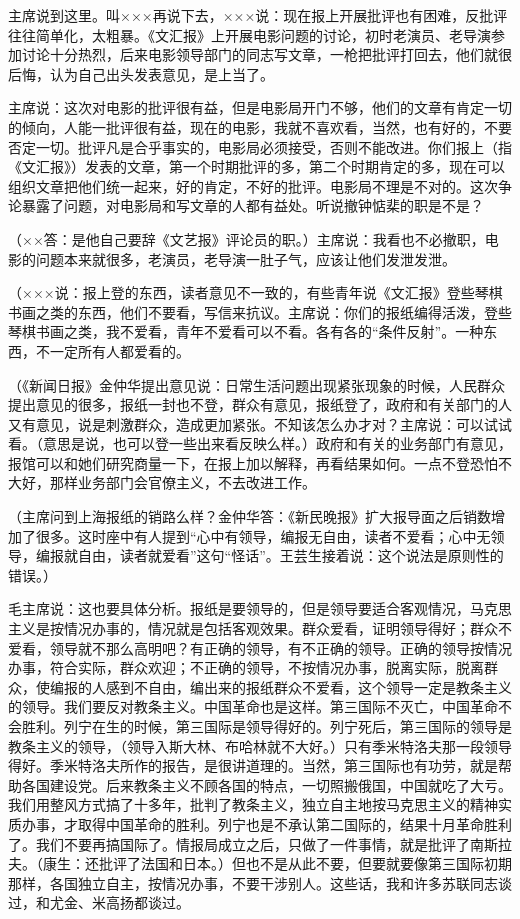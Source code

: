 主席说到这里。叫×××再说下去，×××说：现在报上开展批评也有困难，反批评往往简单化，太粗暴。《文汇报》上开展电影问题的讨论，初时老演员、老导演参加讨论十分热烈，后来电影领导部门的同志写文章，一枪把批评打回去，他们就很后悔，认为自己出头发表意见，是上当了。

主席说：这次对电影的批评很有益，但是电影局开门不够，他们的文章有肯定一切的倾向，人能一批评很有益，现在的电影，我就不喜欢看，当然，也有好的，不要否定一切。批评凡是合乎事实的，电影局必须接受，否则不能改进。你们报上（指《文汇报》）发表的文章，第一个时期批评的多，第二个时期肯定的多，现在可以组织文章把他们统一起来，好的肯定，不好的批评。电影局不理是不对的。这次争论暴露了问题，对电影局和写文章的人都有益处。听说撤钟惦棐的职是不是？

（××答：是他自己要辞《文艺报》评论员的职。）主席说：我看也不必撤职，电影的问题本来就很多，老演员，老导演一肚子气，应该让他们发泄发泄。

（×××说：报上登的东西，读者意见不一致的，有些青年说《文汇报》登些琴棋书画之类的东西，他们不要看，写信来抗议。主席说：你们的报纸编得活泼，登些琴棋书画之类，我不爱看，青年不爱看可以不看。各有各的“条件反射”。一种东西，不一定所有人都爱看的。

（《新闻日报》金仲华提出意见说：日常生活问题出现紧张现象的时候，人民群众提出意见的很多，报纸一封也不登，群众有意见，报纸登了，政府和有关部门的人又有意见，说是刺激群众，造成更加紧张。不知该怎么办才对？主席说：可以试试看。（意思是说，也可以登一些出来看反映么样。）政府和有关的业务部门有意见，报馆可以和她们研究商量一下，在报上加以解释，再看结果如何。一点不登恐怕不大好，那样业务部门会官僚主义，不去改进工作。

（主席问到上海报纸的销路么样？金仲华答：《新民晚报》扩大报导面之后销数增加了很多。这时座中有人提到“心中有领导，编报无自由，读者不爱看；心中无领导，编报就自由，读者就爱看”这句“怪话”。王芸生接着说：这个说法是原则性的错误。）

毛主席说：这也要具体分析。报纸是要领导的，但是领导要适合客观情况，马克思主义是按情况办事的，情况就是包括客观效果。群众爱看，证明领导得好；群众不爱看，领导就不那么高明吧？有正确的领导，有不正确的领导。正确的领导按情况办事，符合实际，群众欢迎；不正确的领导，不按情况办事，脱离实际，脱离群众，使编报的人感到不自由，编出来的报纸群众不爱看，这个领导一定是教条主义的领导。我们要反对教条主义。中国革命也是这样。第三国际不灭亡，中国革命不会胜利。列宁在生的时候，第三国际是领导得好的。列宁死后，第三国际的领导是教条主义的领导，（领导入斯大林、布哈林就不大好。）只有季米特洛夫那一段领导得好。季米特洛夫所作的报告，是很讲道理的。当然，第三国际也有功劳，就是帮助各国建设党。后来教条主义不顾各国的特点，一切照搬俄国，中国就吃了大亏。我们用整风方式搞了十多年，批判了教条主义，独立自主地按马克思主义的精神实质办事，才取得中国革命的胜利。列宁也是不承认第二国际的，结果十月革命胜利了。我们不要再搞国际了。情报局成立之后，只做了一件事情，就是批评了南斯拉夫。（康生：还批评了法国和日本。）但也不是从此不要，但要就要像第三国际初期那样，各国独立自主，按情况办事，不要干涉别人。这些话，我和许多苏联同志谈过，和尤金、米高扬都谈过。

